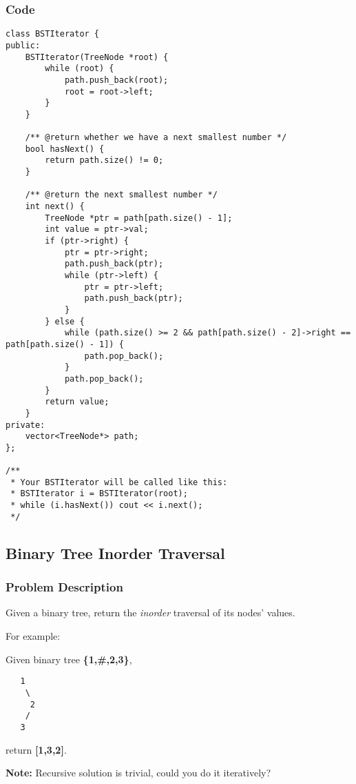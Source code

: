\documentclass{article}
\begin{document}
\begin{CJK*}{UTF8}{gkai}
\subsubsection*{Code}
\begin{lstlisting}
class BSTIterator {
public:
    BSTIterator(TreeNode *root) {
        while (root) {
            path.push_back(root);
            root = root->left;
        }
    }
    
    /** @return whether we have a next smallest number */
    bool hasNext() {
        return path.size() != 0;
    }
    
    /** @return the next smallest number */
    int next() {
        TreeNode *ptr = path[path.size() - 1];
        int value = ptr->val;
        if (ptr->right) {
            ptr = ptr->right;
            path.push_back(ptr);
            while (ptr->left) {
                ptr = ptr->left;
                path.push_back(ptr);
            }
        } else {
            while (path.size() >= 2 && path[path.size() - 2]->right == path[path.size() - 1]) {
                path.pop_back();
            }
            path.pop_back();
        }
        return value;
    }
private:
    vector<TreeNode*> path;
};

/**
 * Your BSTIterator will be called like this:
 * BSTIterator i = BSTIterator(root);
 * while (i.hasNext()) cout << i.next();
 */

\end{lstlisting}


\subsection{ Binary Tree Inorder Traversal }
\label{ Binary Tree Inorder Traversal }

\subsubsection*{Problem Description}
Given a binary tree, return the \emph{inorder} traversal of its nodes' values.

For example:


Given binary tree \textbf{\{1,\#,2,3\}},


\begin{verbatim}
   1
    \
     2
    /
   3
\end{verbatim}

return \textbf{[1,3,2]}.

\textbf{Note:} Recursive solution is trivial, could you do it iteratively?


\end{CJK*}
\end{document}
